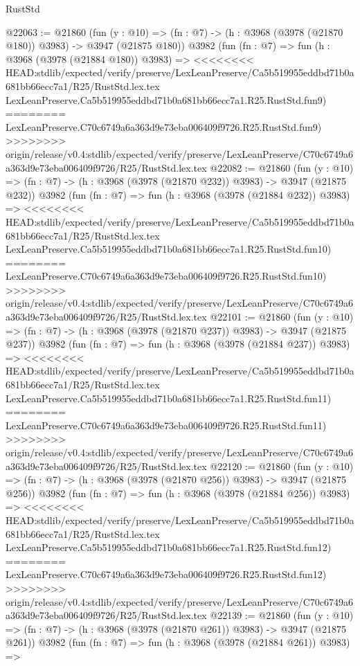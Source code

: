 \begin{lexlean}{RustStd}
\begin{coremodule}
{\begin{coremodule}
{{{{{{{{{{{{{{{{{{{{{{{{{{{{{{{{{{{{{{@22063 := @21860
    (fun (y : @10) => (fn : @7) -> (h : @3968 (@3978 (@21870 @180)) @3983) -> @3947 (@21875 @180))
    @3982
    (fun (fn : @7) =>
    fun (h : @3968 (@3978 (@21884 @180)) @3983) =>
<<<<<<<< HEAD:stdlib/expected/verify/preserve/LexLeanPreserve/Ca5b519955eddbd71b0a681bb66ecc7a1/R25/RustStd.lex.tex
    LexLeanPreserve.Ca5b519955eddbd71b0a681bb66ecc7a1.R25.RustStd.fun9)
========
    LexLeanPreserve.C70c6749a6a363d9e73eba006409f9726.R25.RustStd.fun9)
>>>>>>>> origin/release/v0.4:stdlib/expected/verify/preserve/LexLeanPreserve/C70c6749a6a363d9e73eba006409f9726/R25/RustStd.lex.tex
@22082 := @21860
    (fun (y : @10) => (fn : @7) -> (h : @3968 (@3978 (@21870 @232)) @3983) -> @3947 (@21875 @232))
    @3982
    (fun (fn : @7) =>
    fun (h : @3968 (@3978 (@21884 @232)) @3983) =>
<<<<<<<< HEAD:stdlib/expected/verify/preserve/LexLeanPreserve/Ca5b519955eddbd71b0a681bb66ecc7a1/R25/RustStd.lex.tex
    LexLeanPreserve.Ca5b519955eddbd71b0a681bb66ecc7a1.R25.RustStd.fun10)
========
    LexLeanPreserve.C70c6749a6a363d9e73eba006409f9726.R25.RustStd.fun10)
>>>>>>>> origin/release/v0.4:stdlib/expected/verify/preserve/LexLeanPreserve/C70c6749a6a363d9e73eba006409f9726/R25/RustStd.lex.tex
@22101 := @21860
    (fun (y : @10) => (fn : @7) -> (h : @3968 (@3978 (@21870 @237)) @3983) -> @3947 (@21875 @237))
    @3982
    (fun (fn : @7) =>
    fun (h : @3968 (@3978 (@21884 @237)) @3983) =>
<<<<<<<< HEAD:stdlib/expected/verify/preserve/LexLeanPreserve/Ca5b519955eddbd71b0a681bb66ecc7a1/R25/RustStd.lex.tex
    LexLeanPreserve.Ca5b519955eddbd71b0a681bb66ecc7a1.R25.RustStd.fun11)
========
    LexLeanPreserve.C70c6749a6a363d9e73eba006409f9726.R25.RustStd.fun11)
>>>>>>>> origin/release/v0.4:stdlib/expected/verify/preserve/LexLeanPreserve/C70c6749a6a363d9e73eba006409f9726/R25/RustStd.lex.tex
@22120 := @21860
    (fun (y : @10) => (fn : @7) -> (h : @3968 (@3978 (@21870 @256)) @3983) -> @3947 (@21875 @256))
    @3982
    (fun (fn : @7) =>
    fun (h : @3968 (@3978 (@21884 @256)) @3983) =>
<<<<<<<< HEAD:stdlib/expected/verify/preserve/LexLeanPreserve/Ca5b519955eddbd71b0a681bb66ecc7a1/R25/RustStd.lex.tex
    LexLeanPreserve.Ca5b519955eddbd71b0a681bb66ecc7a1.R25.RustStd.fun12)
========
    LexLeanPreserve.C70c6749a6a363d9e73eba006409f9726.R25.RustStd.fun12)
>>>>>>>> origin/release/v0.4:stdlib/expected/verify/preserve/LexLeanPreserve/C70c6749a6a363d9e73eba006409f9726/R25/RustStd.lex.tex
@22139 := @21860
    (fun (y : @10) => (fn : @7) -> (h : @3968 (@3978 (@21870 @261)) @3983) -> @3947 (@21875 @261))
    @3982
    (fun (fn : @7) =>
    fun (h : @3968 (@3978 (@21884 @261)) @3983) =>
}}}}}}}}}}}}}}}}}}}}}}}}}}}}}}}}}}}}}}
\end{coremodule}}
\end{coremodule}
\end{lexlean}

